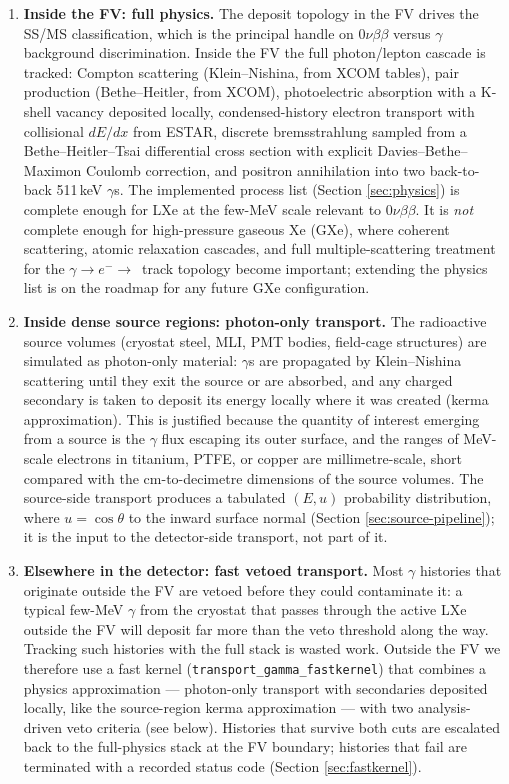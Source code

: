 \documentclass[11pt]{article}
\begin{document}
\begin{enumerate}[label=\textbf{Tier \arabic*.}, leftmargin=2.0cm]

\item \textbf{Inside the FV: full physics.}
The deposit topology in the FV drives the SS/MS classification, which is the
principal handle on $0\nu\beta\beta$ versus $\gamma$ background discrimination.
Inside the FV the full photon/lepton cascade is tracked: Compton scattering
(Klein--Nishina, from XCOM tables), pair production (Bethe--Heitler, from XCOM),
photoelectric absorption with a K-shell vacancy deposited locally, condensed-history
electron transport with collisional $dE/dx$ from ESTAR, discrete bremsstrahlung
sampled from a Bethe--Heitler--Tsai differential cross section with explicit
Davies--Bethe--Maximon Coulomb correction, and positron annihilation into two
back-to-back 511\,keV $\gamma$s. The implemented process list (Section
\ref{sec:physics}) is complete enough for LXe at the few-MeV scale relevant to
$0\nu\beta\beta$. It is \emph{not} complete enough for high-pressure gaseous Xe
(GXe), where coherent scattering, atomic relaxation cascades, and full
multiple-scattering treatment for the $\gamma\to e^-\to$~track topology become
important; extending the physics list is on the roadmap for any future GXe
configuration.

\item \textbf{Inside dense source regions: photon-only transport.}
The radioactive source volumes (cryostat steel, MLI, PMT bodies, field-cage
structures) are simulated as photon-only material: $\gamma$s are propagated by
Klein--Nishina scattering until they exit the source or are absorbed, and any
charged secondary is taken to deposit its energy locally where it was created
(kerma approximation). This is justified because the quantity of interest
emerging from a source is the $\gamma$ flux escaping its outer surface, and the
ranges of MeV-scale electrons in titanium, PTFE, or copper are millimetre-scale,
short compared with the cm-to-decimetre dimensions of the source volumes. The
source-side transport produces a tabulated $(E, u)$ probability distribution,
where $u = \cos\theta$ to the inward surface normal (Section
\ref{sec:source-pipeline}); it is the input to the detector-side transport, not
part of it.

\item \textbf{Elsewhere in the detector: fast vetoed transport.}
Most $\gamma$ histories that originate outside the FV are vetoed before they
could contaminate it: a typical few-MeV $\gamma$ from the cryostat that passes
through the active LXe outside the FV will deposit far more than the veto
threshold along the way. Tracking such histories with the full stack is wasted
work. Outside the FV we therefore use a fast kernel
(\texttt{transport\_gamma\_fastkernel}) that combines a physics approximation ---
photon-only transport with secondaries deposited locally, like the
source-region kerma approximation --- with two analysis-driven veto criteria
(see below). Histories that survive both cuts are escalated back to the
full-physics stack at the FV boundary; histories that fail are terminated with
a recorded status code (Section \ref{sec:fastkernel}).
\end{enumerate}
\end{document}
